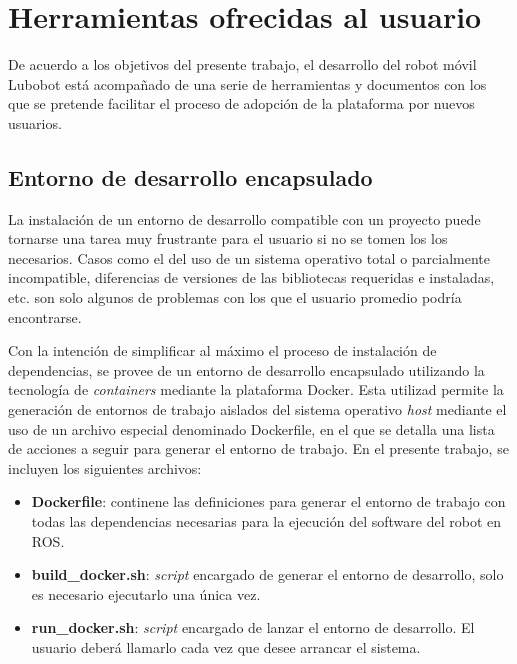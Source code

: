 \section{Herramientas ofrecidas al usuario}

De acuerdo a los objetivos del presente trabajo, el desarrollo del robot móvil Lubobot está acompañado de una serie de herramientas y documentos con los que se pretende facilitar el proceso de adopción de la plataforma por nuevos usuarios.

\subsection{Entorno de desarrollo encapsulado}

La instalación de un entorno de desarrollo compatible con un proyecto puede tornarse una tarea muy frustrante para el usuario si no se tomen los los necesarios. Casos como el del uso de un sistema operativo total o parcialmente incompatible, diferencias de versiones de las bibliotecas requeridas e instaladas, etc. son solo algunos de problemas con los que el usuario promedio podría encontrarse.

Con la intención de simplificar al máximo el proceso de instalación de dependencias, se provee de un entorno de desarrollo encapsulado utilizando la tecnología de \textit{containers} mediante la plataforma Docker\protect\footnotemark. Esta utilizad permite la generación de entornos de trabajo aislados del sistema operativo \textit{host} mediante el uso de un archivo especial denominado Dockerfile, en el que se detalla una lista de acciones a seguir para generar el entorno de trabajo. En el presente trabajo, se incluyen los siguientes archivos:

\begin{itemize}
  \item \textbf{Dockerfile}: continene las definiciones para generar el entorno de trabajo con todas las dependencias necesarias para la ejecución del software del robot en ROS.
  \item \textbf{build\_docker.sh}: \textit{script} encargado de generar el entorno de desarrollo, solo es necesario ejecutarlo una única vez.
  \item \textbf{run\_docker.sh}: \textit{script} encargado de lanzar el entorno de desarrollo. El usuario deberá llamarlo cada vez que desee arrancar el sistema.
\end{itemize}


